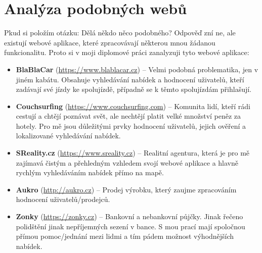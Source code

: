 \chapter{Analýza podobných webů}
\label{analyza}

Pkud si položím otázku: Dělá někdo něco podobného? Odpověď zní ne, ale existují webové aplikace, které zpracovávají některou mnou žádanou funkcionalitu. Proto si v moji diplomové práci zanalyzuji tyto webové aplikace:
\begin{itemize}
	\item \textbf{BlaBlaCar} (\url{https://www.blablacar.cz}) – Velmi podobná problematika, jen v jiném kabátu. Obsahuje vyhledávání nabídek a hodnocení uživatelů, kteří zadávají své jízdy ke spolujízdě, případně se k těmto spolujízdám přihlašují.

	\item \textbf{Couchsurfing} (\url{https://www.couchsurfing.com}) – Komunita lidí, kteří rádi cestují a chtějí poznávat svět, ale nechtějí platit velké množství peněz za hotely. Pro mě jsou důležitými prvky hodnocení uživatelů, jejich ověření a lokalizované vyhledávání nabídek.

	\item \textbf{SReality.cz} (\url{https://www.sreality.cz}) – Realitní agentura, která je pro mě zajímavá čistým a přehledným vzhledem svojí webové aplikace a hlavně rychlým vyhledáváním nabídek přímo na mapě.

	\item \textbf{Aukro} (\url{http://aukro.cz}) – Prodej výrobku, který zaujme zpracováním hodnocení uživatelů/prodejců.

	\item \textbf{Zonky} (\url{https://zonky.cz}) – Bankovní a nebankovní půjčky. Jinak řečeno polidštění jinak nepříjemných sezení v bance. S mou prací mají spoločnou přímou pomoc/jednání mezi lidmi a tím pádem možnost výhodnějších nabídek.
\end{itemize}

\newpage

\newpage

\newpage

\newpage

\newpage

